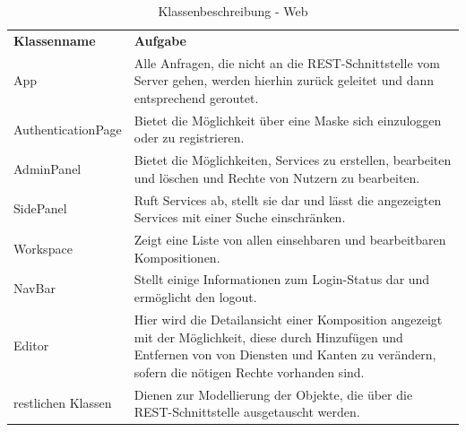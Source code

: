 \begin{table}[h]
	\centering
	\begin{tabularx}{\textwidth}{X X}
		\rowcolor[HTML]{C0C0C0} 
		\textbf{Klassenname} & \textbf{Aufgabe} \\
		App & Alle Anfragen, die nicht an die REST-Schnittstelle vom Server gehen, werden hierhin zurück geleitet
		und dann entsprechend geroutet. \\
		\rowcolor[HTML]{E7E7E7} 
		AuthenticationPage & Bietet die Möglichkeit über eine Maske sich einzuloggen oder zu registrieren. \\
		AdminPanel & Bietet die Möglichkeiten, Services zu erstellen, bearbeiten und löschen und Rechte von Nutzern zu bearbeiten. \\
		\rowcolor[HTML]{E7E7E7} 
		SidePanel & Ruft Services ab, stellt sie dar und lässt die angezeigten Services mit einer Suche einschränken. \\
		Workspace & Zeigt eine Liste von allen einsehbaren und bearbeitbaren Kompositionen. \\
		\rowcolor[HTML]{E7E7E7} 
		NavBar & Stellt einige Informationen zum Login-Status dar und ermöglicht den logout. \\
		Editor & Hier wird die Detailansicht einer Komposition angezeigt mit der Möglichkeit, diese durch Hinzufügen und Entfernen von
		von Diensten und Kanten zu verändern, sofern die nötigen Rechte vorhanden sind. \\
		\rowcolor[HTML]{E7E7E7} 
		restlichen Klassen & Dienen zur Modellierung der Objekte, die über die REST-Schnittstelle ausgetauscht werden. 
	\end{tabularx}
	\caption{Klassenbeschreibung - Web}
	\label{table:klassenbeschreibung-web}
\end{table}
